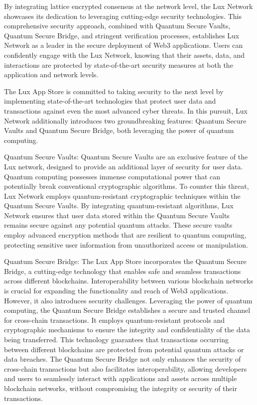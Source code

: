 \documentclass[11pt]{article}
\begin{document}
By integrating lattice encrypted consensus at the network level, the Lux Network showcases its dedication to leveraging cutting-edge security technologies. This comprehensive security approach, combined with Quantum Secure Vaults, Quantum Secure Bridge, and stringent verification processes, establishes Lux Network as a leader in the secure deployment of Web3 applications. Users can confidently engage with the Lux Network, knowing that their assets, data, and interactions are protected by state-of-the-art security measures at both the application and network levels.


The Lux App Store is committed to taking security to the next level by implementing state-of-the-art technologies that protect user data and transactions against even the most advanced cyber threats. In this pursuit, Lux Network additionally introduces two groundbreaking features: Quantum Secure Vaults and Quantum Secure Bridge, both leveraging the power of quantum computing.


Quantum Secure Vaults: Quantum Secure Vaults are an exclusive feature of the Lux network, designed to provide an additional layer of security for user data. Quantum computing possesses immense computational power that can potentially break conventional cryptographic algorithms. To counter this threat, Lux Network employs quantum-resistant cryptographic techniques within the Quantum Secure Vaults.
By integrating quantum-resistant algorithms, Lux Network ensures that user data stored within the Quantum Secure Vaults remains secure against any potential quantum attacks. These secure vaults employ advanced encryption methods that are resilient to quantum computing, protecting sensitive user information from unauthorized access or manipulation.


Quantum Secure Bridge: The Lux App Store incorporates the Quantum Secure Bridge, a cutting-edge technology that enables safe and seamless transactions across different blockchains. Interoperability between various blockchain networks is crucial for expanding the functionality and reach of Web3 applications. However, it also introduces security challenges.
Leveraging the power of quantum computing, the Quantum Secure Bridge establishes a secure and trusted channel for cross-chain transactions. It employs quantum-resistant protocols and cryptographic mechanisms to ensure the integrity and confidentiality of the data being transferred. This technology guarantees that transactions occurring between different blockchains are protected from potential quantum attacks or data breaches.
The Quantum Secure Bridge not only enhances the security of cross-chain transactions but also facilitates interoperability, allowing developers and users to seamlessly interact with applications and assets across multiple blockchain networks, without compromising the integrity or security of their transactions.
\end{document}
